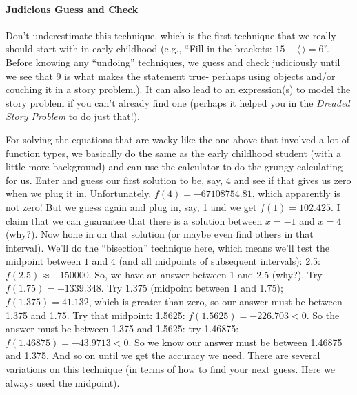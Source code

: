 \paragraph{Judicious Guess and Check}  
Don't underestimate this technique, which is the first technique that
we really should start with in early childhood (e.g., ``Fill in the
brackets: $15-\langle\, \rangle=6$''.  Before knowing any ``undoing''
techniques, we guess and check judiciously until we see that $9$ is what
makes the statement true- perhaps using objects and/or couching it in
a story problem.).  It can also lead to an expression(s) to model the
story problem if you can't already find one (perhaps it helped you in
the \textit{Dreaded Story Problem} to do just that!).  

For solving the equations that are wacky like the one above that
involved a lot of function types, we basically do the same as the
early childhood student (with a little more background) and can use
the calculator to do the grungy calculating for us.  Enter and guess
our first solution to be, say, 4 and see if that gives us zero when we
plug it in.  Unfortunately, $f(4) = -67108754.81$, which apparently is
not zero!  But we guess again and plug in, say, 1 and we get $f(1) =
102.425$.  I claim that we can guarantee that there is a solution
between $x = -1$ and $x = 4$ (why?).  Now hone in on that solution (or
maybe even find others in that interval).  We'll do the ``bisection''
technique here, which means we'll test the midpoint between $1$ and $4$
(and all midpoints of subsequent intervals): 2.5: $f(2.5) \approx -150000$. So, we have an answer between 1 and 2.5 (why?).  Try $f(1.75)=
-1339.348$.  Try 1.375 (midpoint between 1 and 1.75); $f(1.375)=41.132$,
which is greater than zero, so our answer must be between 1.375 and
1.75.  Try that midpoint: 1.5625: $f(1.5625)=-226.703<0$.  So the answer
must be between 1.375 and 1.5625: try 1.46875: $f(1.46875)=-43.9713<0$.
So we know our answer must be between 1.46875 and 1.375.  And so on
until we get the accuracy we need.  There are several variations on
this technique (in terms of how to find your next guess.  Here we
always used the midpoint).

